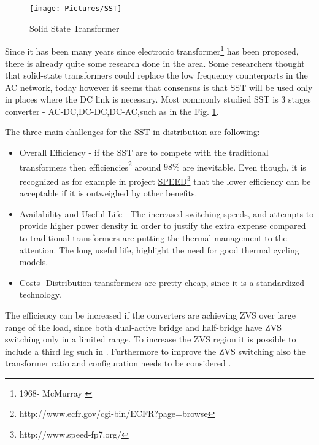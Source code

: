 \documentclass[]{scrartcl}
\begin{document}
\begin{figure}[h!]
	\centering
	\texttt{[image: Pictures/SST]}
	\caption{Solid State Transformer}
	\label{fig:SST}
\end{figure}

Since it has been many years since electronic transformer\footnote{1968- McMurray \cite{McMurray1971}} has been proposed, there is already quite some research done in the area. Some researchers thought that solid-state transformers could replace the low frequency counterparts in the AC network, today however it seems that consensus is that SST will be used only in places where the DC link is necessary\cite{Kolar2014d}. Most commonly studied SST is 3 stages converter - AC-DC,DC-DC,DC-AC,such as in the Fig. \ref{fig:SST}. 



The three main challenges for the SST in distribution are following\cite{Huang2013}:
\begin{itemize}
	\item Overall Efficiency - if the SST are to compete with the traditional transformers then \href{<http://www.ecfr.gov/cgi-bin/ECFR?page=browse>}{efficiencies}\footnote{http://www.ecfr.gov/cgi-bin/ECFR?page=browse} around $98\%$ are inevitable. Even though, it is recognized as for example in project \href{<http://www.speed-fp7.org/>}{SPEED}\footnote{http://www.speed-fp7.org/} that the lower efficiency can be acceptable if it is outweighed by other benefits.
	\item Availability and Useful Life - The increased switching speeds, and attempts to provide higher power density in order to justify the extra expense compared to traditional transformers are putting the thermal management to the attention. The long useful life, highlight the need for good thermal cycling models.
	\item Costs- Distribution transformers are pretty cheap, since it is a  standardized technology. 
\end{itemize}




 

The efficiency can be increased if the converters are achieving ZVS over large range of the load, since both dual-active bridge and half-bridge have ZVS switching only in  a limited range. To increase the ZVS region it is possible to include a third leg such in \cite{Baars2015}. Furthermore to improve the ZVS switching also the transformer ratio and configuration needs to be considered \cite{Baars2015b}.
\end{document}
